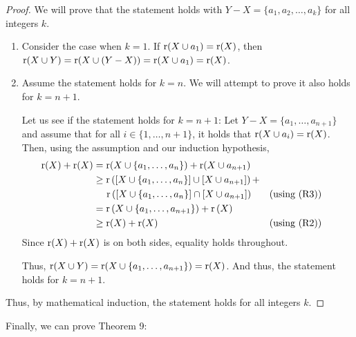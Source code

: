\begin{proof}
    We will prove that the statement holds with $Y-X = \{a_1,a_2,\dots,a_k\}$ for all integers $k$.
    \begin{enumerate}
        \item Consider the case when $k=1$. If $\operatorname{r}(X\cup a_1)=\operatorname{r}(X)$, then $\operatorname{r}(X\cup Y)=\operatorname{r}(X\cup(Y-X))=\operatorname{r}(X\cup a_1)=\operatorname{r}(X)$.
        \item Assume the statement holds for $k=n$. We will attempt to prove it also holds for $k = n + 1$.
        
        Let us see if the statement holds for $k=n+1$: Let $Y-X=\{a_1,\dots,a_{n+1}\}$ and assume that for all $i\in\{1,\dots,n+1\}$, it holds that $\operatorname{r}(X\cup a_i)=\operatorname{r}(X)$. Then, using the assumption and our induction hypothesis, 
        \begin{align*}
            \operatorname{r}(X)+\operatorname{r}(X) &= \operatorname{r}(X\cup \{a_1,\dots,a_n\})+\operatorname{r}(X\cup a_{n+1}) 
            \\&\geq \operatorname{r}\left(\left[X\cup\{a_1,\dots,a_n\}\right]\cup \left[X\cup a_{n+1}\right]\right) +
             \\ &\quad\:  \operatorname{r}\left([X\cup\{a_1,\dots,a_n\}]\cap [X\cup a_{n+1}]\right)  && \text{(using (R3))}
            \\&= \operatorname{r}\left(X\cup\{a_1,\dots,a_{n+1}\}\right) + \operatorname{r}\left(X\right) 
            \\&\geq \operatorname{r}(X)+\operatorname{r}(X)  && \text{(using (R2)) }
        \end{align*}
        Since $\operatorname{r}(X)+\operatorname{r}(X)$ is on both sides, equality holds throughout. 
        
        Thus, $\operatorname{r}(X\cup Y) = \operatorname{r}(X\cup\{a_1,\dots,a_{n+1}\})=\operatorname{r}(X)$. And thus, the statement holds for $k=n+1$.
    \end{enumerate}
    Thus, by mathematical induction, the statement holds for all integers $k$.
\end{proof}
Finally, we can prove Theorem 9:
